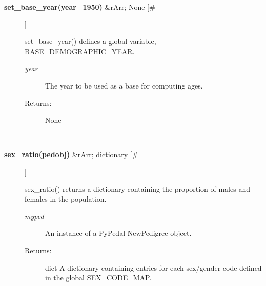 \documentclass[10pt]{article}
\begin{document}
\begin{description}
\item[\textbf{set\_base\_year(year=1950)}
 \&rArr; None [\#]]

 set\_base\_year() defines a global variable, BASE\_DEMOGRAPHIC\_YEAR.
\begin{description}
\item[\emph{year}
] The year to be used as a base for computing ages.
\item[Returns:] None

\end{description}
\\ 

\item[\textbf{sex\_ratio(pedobj)}
 \&rArr; dictionary [\#]]

 sex\_ratio() returns a dictionary containing the proportion of males and females in the population.
\begin{description}
\item[\emph{myped}
] An instance of a PyPedal NewPedigree object.
\item[Returns:] dict A dictionary containing entries for each sex/gender code defined in the global SEX\_CODE\_MAP.

\end{description}
\\ 


\end{description}
\end{document}
